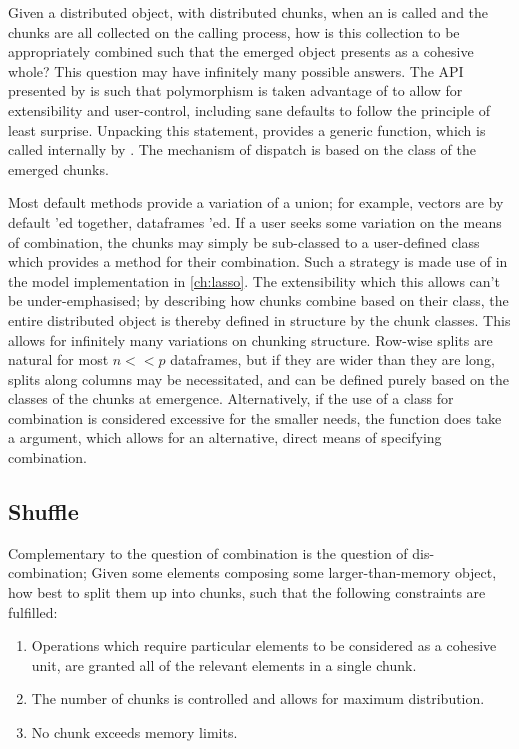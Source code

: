 Given a distributed object, with distributed chunks, when an  is called and the chunks are all collected on the calling process, how is this collection to be appropriately combined such that the emerged object presents as a cohesive whole?
This question may have infinitely many possible answers.
The API presented by \lsr{} is such that polymorphism is taken advantage of to allow for extensibility and user-control, including sane defaults to follow the principle of least surprise.
Unpacking this statement, \lsr{} provides a generic  function, which is called internally by .
The mechanism of dispatch is based on the class of the emerged chunks.

Most default  methods provide a variation of a union; for example, vectors are by default 'ed together, dataframes 'ed.
If a user seeks some variation on the means of combination, the chunks may simply be sub-classed to a user-defined class which provides a  method for their combination.
Such a strategy is made use of in the model implementation in \cref{ch:lasso}.
The extensibility which this allows can't be under-emphasised; by describing how chunks combine based on their class, the entire distributed object is thereby defined in structure by the chunk classes.
This allows for infinitely many variations on chunking structure.
Row-wise splits are natural for most $n<<p$ dataframes, but if they are wider than they are long, splits along columns may be necessitated, and can be defined purely based on the classes of the chunks at emergence.
Alternatively, if the use of a class for combination is considered excessive for the smaller needs, the  function does take a  argument, which allows for an alternative, direct means of specifying combination.

\subsection{Shuffle}\label{sec:shuffle}

Complementary to the question of combination is the question of dis-combination; Given some elements composing some larger-than-memory object, how best to split them up into chunks, such that the following constraints are fulfilled:

\begin{enumerate} \item Operations which require particular elements to be considered as a cohesive unit, are granted all of the relevant elements in a single chunk.
	\item The number of chunks is controlled and allows for maximum distribution.
	\item No chunk exceeds memory limits.
\end{enumerate}

